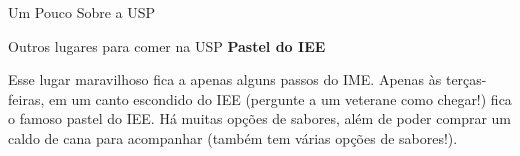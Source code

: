 \begin{secao}{Um Pouco Sobre a USP}
\begin{subsecao}{Outros lugares para comer na USP}
{\bf Pastel do IEE}

Esse lugar maravilhoso fica a apenas alguns passos do IME. Apenas às terças-feiras,
em um canto escondido do IEE (pergunte a um veterane como chegar!) fica o famoso pastel do IEE.
Há muitas opções de sabores, além de poder comprar um caldo de cana para acompanhar (também tem várias opções de sabores!).

\end{subsecao}

\end{secao}
